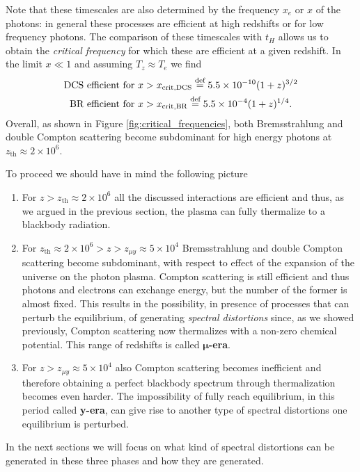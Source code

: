 Note that these timescales are also determined by the frequency $x_e$ or $x$ of the photons: in general these processes are efficient at high redshifts or for low frequency photons. The comparison of these timescales with $t_H$ allows us to obtain the \emph{critical frequency} for which these are efficient at a given redshift.
In the limit $x\ll1$ and assuming $T_z\approx T_e$ we find
\begin{align*}
    \text{DCS efficient for }x&>x_{\text{crit,DCS}}\stackrel{\text{def}}{=}5.5\times10^{-10}(1+z)^{3/2}\\
    \text{BR efficient for }x&>x_{\text{crit,BR}}\stackrel{\text{def}}{=}5.5\times10^{-4}(1+z)^{1/4}.
\end{align*}  
Overall, as shown in Figure \ref{fig:critical_frequencies}, both Bremsstrahlung and double Compton scattering become subdominant for high energy photons at $z_{\text{th}}\approx2\times10^6$.\newpage

To proceed we should have in mind the following picture
\begin{enumerate}
    \item For $z>z_{\text{th}}\approx2\times10^6$ all the discussed interactions are efficient and thus, as we argued in the previous section, the plasma can fully thermalize to a blackbody radiation.
    \item For $z_{\text{th}}\approx2\times10^6>z>z_{\mu y}\approx 5\times 10^4$ Bremsstrahlung and double Compton scattering become subdominant, with respect to effect of the expansion of the universe on the photon plasma. Compton scattering is still efficient and thus photons and electrons can exchange energy, but the number of the former is almost fixed. This results in the possibility, in presence of processes that can perturb the equilibrium, of generating \emph{spectral distortions} since, as we showed previously, Compton scattering now thermalizes with a non-zero chemical potential. This range of redshifts is called $\boldsymbol{\mu}$\textbf{-era}.
    \item For $z>z_{\mu y}\approx 5\times 10^4$ also Compton scattering becomes inefficient and therefore obtaining a perfect blackbody spectrum through thermalization becomes even harder. The impossibility of fully reach equilibrium, in this period called \textbf{y-era}, can give rise to another type of spectral distortions one equilibrium is perturbed.
\end{enumerate}
In the next sections we will focus on what kind of spectral distortions can be generated in these three phases and how they are generated.

